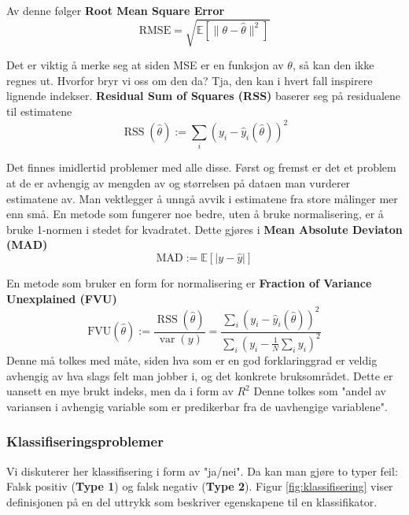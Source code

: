 \documentclass[12pt]{article}
\begin{document}
Av denne følger \textbf{Root Mean Square Error}
\begin{equation}
\textrm{RMSE} = \sqrt{\mathbb{E}\left[\|\theta-\widehat{\theta}\|^{2}\right]}
\end{equation}

Det er viktig å merke seg at siden MSE er en funksjon av $\theta$, så kan den ikke regnes ut. Hvorfor bryr vi oss om den da? Tja, den kan i hvert fall inspirere lignende indekser. \textbf{Residual Sum of Squares (RSS)} baserer seg på residualene til estimatene
\begin{equation}
\operatorname{RSS}(\widehat{\theta}):=\sum_{i}\left(y_{i}-\widehat{y}_{i}(\widehat{\theta})\right)^{2}
\end{equation}

Det finnes imidlertid problemer med alle disse. Først og fremst er det et problem at de er avhengig av mengden av og størrelsen på dataen man vurderer estimatene av. Man vektlegger å unngå avvik i estimatene fra store målinger mer enn små. En metode som fungerer noe bedre, uten å bruke normalisering, er å bruke 1-normen i stedet for kvadratet. Dette gjøres i \textbf{Mean Absolute Deviaton (MAD)}
\begin{equation}
\mathrm{MAD}:=\mathbb{E}[|y-\widehat{y}|]
\end{equation}

En metode som bruker en form for normalisering er \textbf{Fraction of Variance Unexplained (FVU)}
\begin{equation}
\mathrm{FVU}(\widehat{\theta}):=\frac{\operatorname{RSS}(\widehat{\theta})}{\operatorname{var}(y)}=\frac{\sum_{i}\left(y_{i}-\widehat{y}_{i}(\widehat{\theta})\right)^{2}}{\sum_{i}\left(y_{i}-\frac{1}{N} \sum_{i} y_{i}\right)^{2}}
\end{equation}
Denne må tolkes med måte, siden hva som er en god forklaringgrad er veldig avhengig av hva slags felt man jobber i, og det konkrete bruksområdet. Dette er uansett en mye brukt indeks, men da i form av $R^{2}$
Denne tolkes som "andel av variansen i avhengig variable som er predikerbar fra de uavhengige variablene".

\subsubsection{Klassifiseringsproblemer}
Vi diskuterer her klassifisering i form av "ja/nei". Da kan man gjøre to typer feil: Falsk positiv (\textbf{Type 1}) og falsk negativ (\textbf{Type 2}). Figur \ref{fig:klassifisering} viser definisjonen på en del uttrykk som beskriver egenskapene til en klassifikator.
\end{document}
